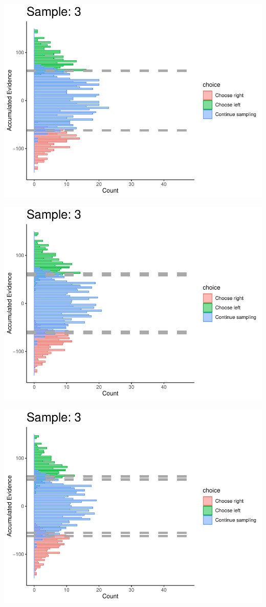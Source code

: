 \documentclass[
]{book}
\begin{document}
\begin{center}\includegraphics[width=0.8\linewidth]{LateNightBayes_files/figure-latex/collapsing_check-26} \end{center}

\begin{center}\includegraphics[width=0.8\linewidth]{LateNightBayes_files/figure-latex/collapsing_check-27} \end{center}

\begin{center}\includegraphics[width=0.8\linewidth]{LateNightBayes_files/figure-latex/collapsing_check-28} \end{center}
\end{document}
